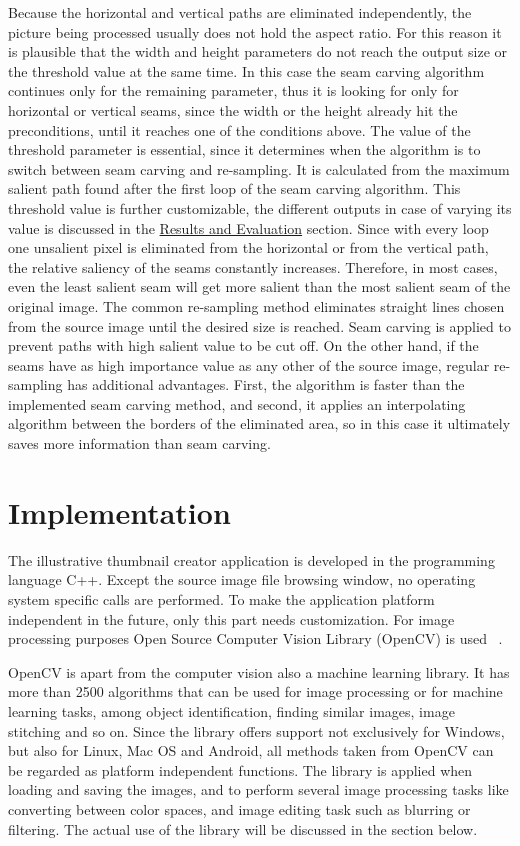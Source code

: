 \documentclass[draft,final]{vutinfth} %
\begin{document}
	Because the horizontal and vertical paths are eliminated independently, the picture being processed usually does not hold the aspect ratio.
	For this reason it is plausible that the width and height parameters do not reach the output size or the threshold value at the same time.
	In this case the seam carving algorithm continues only for the remaining parameter, thus it is looking for only for horizontal or vertical seams, since the width or the height already hit the preconditions, until it reaches one of the conditions above. 
    The value of the threshold parameter is essential,	since it determines when the algorithm is to switch between seam carving and re-sampling. 
	It is calculated from the maximum salient path found after the first loop of the seam carving algorithm.
	This threshold value is further customizable, the different outputs in case of varying its value is discussed in the \hyperref[res:resampling]{Results and Evaluation} section.
	Since with every loop one unsalient pixel is eliminated from the horizontal or from the vertical path, the relative saliency of the seams constantly increases.
	Therefore, in most cases, even the least salient seam will get more salient than the most salient seam of the original image. 
	The common re-sampling method eliminates straight lines chosen from the source image until the desired size is reached.
	Seam carving is applied to prevent paths with high salient value to be cut off.
	On the other hand, if the seams have as high importance value as any other of the source image, regular re-sampling has additional advantages.
	First, the algorithm is faster than the implemented seam carving method, and second, it applies an interpolating algorithm between the borders of the eliminated area, so in this case it ultimately saves more information than seam carving.   
	
	\chapter{Implementation}
	\label{implementation}
	The illustrative thumbnail creator application is developed in the programming language C++.
	Except the source image file browsing window, no operating system specific calls are performed.
	To make the application platform independent in the future, only this part needs customization.
	For image processing purposes Open Source Computer Vision Library (OpenCV) is used ~\cite{opencv_library}.\par 
	OpenCV is apart from the computer vision also a machine learning library.     
	It has more than 2500 algorithms that can be used for image processing or for machine learning tasks, among object identification, finding similar images, image stitching and so on.
	Since the library offers support not exclusively for Windows, but also for Linux, Mac OS and Android, all methods taken from OpenCV can be regarded as platform independent functions.
	The library is applied when loading and saving the images, and to perform several image processing tasks like converting between color spaces, and image editing task such as blurring or filtering.
	The actual use of the library will be discussed in the section below.
	
\end{document}
